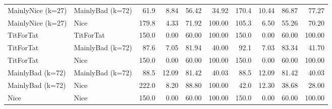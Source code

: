 \documentclass[journal,a4paper,10pt,twoside]{IEEEtran} %
\begin{document}
\begin{table}[ht]
\begin{tabular}{ll|rrrr|rrrr}
		MainlyNice (k=27) & MainlyBad (k=72)  &  61.9 &  8.84 &  56.42 &      34.92 & 170.4 & 10.44 &  86.87 &      77.27 \\
		MainlyNice (k=27) & Nice              & 179.8 &  4.33 &  71.92 &     100.00 & 105.3 &  6.50 &  55.26 &      70.20 \\
		TitForTat         & TitForTat         & 150.0 &  0.00 &  60.00 &     100.00 & 150.0 &  0.00 &  60.00 &     100.00 \\
		TitForTat         & MainlyBad (k=72)  &  87.6 &  7.05 &  81.94 &      40.00 &  92.1 &  7.03 &  83.34 &      41.70 \\
		TitForTat         & Nice              & 150.0 &  0.00 &  60.00 &     100.00 & 150.0 &  0.00 &  60.00 &     100.00 \\
		MainlyBad (k=72)  & MainlyBad (k=72)  &  88.5 & 12.09 &  81.42 &      40.03 &  88.5 & 12.09 &  81.42 &      40.03 \\
		MainlyBad (k=72)  & Nice              & 222.0 &  8.20 &  88.80 &     100.00 &  42.0 & 12.30 &  38.68 &      28.00 \\
		Nice              & Nice              & 150.0 &  0.00 &  60.00 &     100.00 & 150.0 &  0.00 &  60.00 &     100.00 \\ \bottomrule
	\end{tabular}
\end{table}
\end{document}
